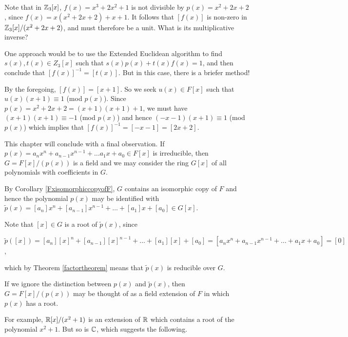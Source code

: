 \documentclass[11pt,fleqn,dvipsnames,usenames]{article}
\newcommand{\p}{\noindent}
\begin{document}
%
\begin{example}
Note that in $\mathbb{Z}_3[x]$, $f(x) = x^3 + 2x^2 + 1$ is not divisible by $p(x)=x^2 + 2x + 2$, since $f(x) = x(x^2 + 2x + 2) + x + 1$.  It follows that $[f(x)]$ is non-zero in $\mathbb{Z}_3[x]/(x^2 + 2x + 2)$, and must therefore be a unit.  What is its multiplicative inverse?
\end{example}
%
\begin{solution}
One approach would be to use the Extended Euclidean algorithm to find $s(x),t(x)\in Z_3[x]$ such that $s(x)p(x) + t(x)f(x) = 1$, and then conclude that $[f(x)]^{-1} = [t(x)]$.  But in this case, there is a briefer method!
\vsp

\p By the foregoing, $[f(x)] = [x+1]$.  So we seek $u(x)\in F[x]$ such that $u(x)(x+1)\equiv 1$ (mod $p(x)$).  Since $p(x) = x^2 + 2x + 2 = (x+1)(x+1) + 1$, we must have $(x+1)(x+1) \equiv -1$ (mod $p(x)$) and hence $(-x-1)(x+1)\equiv 1$ (mod $p(x)$) which implies that $[f(x)]^{-1} = [-x-1] = [2x + 2]$.
\end{solution}
\vsp

\GRAYLINE

%
\p This chapter will conclude with a final observation. If $p(x) = a_{n}x^{n} + a_{n-1}x^{n-1} + \ldots a_{1}x + a_{0}\in F[x]$ is irreducible, then $G = F[x]/(p(x))$ is a field and we may consider the ring $G[x]$ of all polynomials with coefficients in $G$.
\vsp

\p By Corollary \ref{FxisomorphiccopyofF}, $G$ contains an isomorphic copy of $F$ and hence the polynomial $p(x)$ may be identified with
$\tilde{p}(x) = [a_{n}]x^{n} + [a_{n-1}]x^{n-1} + \ldots + [a_{1}]x + [a_{0}]\in G[x]$.
\vsp

\p Note that $[x]\in G$ is a root of $\tilde{p}(x)$, since
\begin{center}
$\tilde{p}([x]) = [a_{n}][x]^{n} + [a_{n-1}][x]^{n-1} + \ldots + [a_{1}][x] + [a_{0}]
= [a_{n}x^{n} + a_{n-1}x^{n-1} + \ldots + a_{1}x + a_{0}]
= [0]$,
\end{center}
which by Theorem \ref{factortheorem} means that $\tilde{p}(x)$ is reducible over $G$.
\vsp

\p If we ignore the distinction between $p(x)$ and $\tilde{p}(x)$, then $G = F[x]/(p(x))$ may be thought of as a field extension of $F$ in which $p(x)$ has a root.
\vsp

\p For example, $\mathbb{R}[x]/(x^2+1)$ is an extension of $\mathbb{R}$ which contains a root of the polynomial $x^2 + 1$.  But so is $\mathbb{C}$, which suggests the following.
\end{document}
